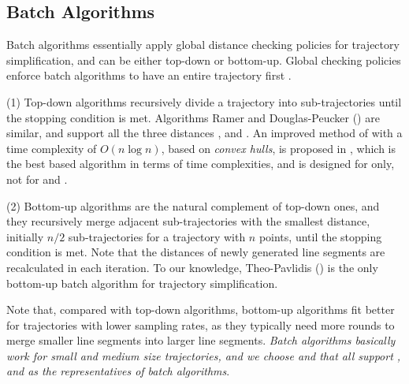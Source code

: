 \subsection{Batch Algorithms}
Batch algorithms essentially apply global distance checking policies for trajectory simplification, and can be either top-down or bottom-up.
Global checking policies enforce batch algorithms to have an entire trajectory first \cite{Meratnia:Spatiotemporal}.

(1) Top-down algorithms recursively divide a trajectory into sub-trajectories until the stopping condition is met.
Algorithms Ramer \cite{Ramer:Split} and Douglas-Peucker (\dpa)  \cite{Douglas:Peucker} are similar, and support all the three distances \ped, \sed and \dad.
An improved method of \dpa with a time complexity of $O(n\log n)$, based on \emph{convex hulls}, is proposed in \cite{Hershberger:Speeding}, which is the best \dpa based  algorithm in terms of time complexities, and is designed for \ped only, not for \sed and \dad.



(2) Bottom-up algorithms are the natural complement of top-down ones, and they recursively merge adjacent sub-trajectories with the smallest distance, initially $n/2$  sub-trajectories for a trajectory with $n$ points, until the stopping condition is met. Note that the distances of newly generated line segments are recalculated in {each} iteration. To our knowledge, Theo-Pavlidis (\tpa) \cite{Pavlidis:Segment} is the only bottom-up batch \lsa algorithm for trajectory simplification.

Note that, compared with top-down algorithms, bottom-up algorithms fit better for trajectories with lower sampling rates, as they typically need more rounds to merge smaller line segments into larger line segments. {\em Batch algorithms basically work for small and medium size trajectories, and we choose \dpa and \tpa that all support \ped, \sed and \dad  as the   representatives of  batch \lsa algorithms}.







